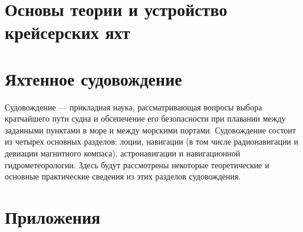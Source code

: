 \documentclass[a4paper, 12pt, twoside, final, book, russian, fittopage, cyremdash]{ncc}
\begin{document}
\frontmatter



{\small \tableofcontents}
{\small \listoffigures}
{\small \listoftables}

\mainmatter

\part{Основы теории и устройство крейсерских яхт}






\part{Яхтенное судовождение}

Судовождение --- прикладная наука, рассматривающая вопросы выбора кратчайшего пути судна и обсепечение его безопасности при плавании между заданными пунктами в море и между морскими портами. Судовождение состоит из четырех основных разделов: лоции, навигации (в том числе радионавигации и девиации магнитного компаса), астронавигации и навигационной гидрометеорологии. Здесь будут рассмотрены некоторые теоретические и основные практические сведения из этих разделов судовождения.








\part{Приложения}




\printindex
\end{document}
